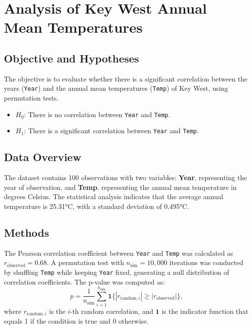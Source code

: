\documentclass[a4paper,10pt]{article}
\begin{document}
\pagestyle{empty}

\section*{\centering Analysis of Key West Annual Mean Temperatures}

\subsection*{Objective and Hypotheses}
The objective is to evaluate whether there is a significant correlation between the years (\texttt{Year}) and the annual mean temperatures (\texttt{Temp}) of Key West, using permutation tests.

\begin{itemize}
    \item \(H_0\): There is no correlation between \texttt{Year} and \texttt{Temp}.
    \item \(H_1\): There is a significant correlation between \texttt{Year} and \texttt{Temp}.
\end{itemize}

\subsection*{Data Overview}
The dataset contains 100 observations with two variables: \textbf{Year}, representing the year of observation, and \textbf{Temp}, representing the annual mean temperature in degrees Celsius. The statistical analysis indicates that the average annual temperature is 25.31°C, with a standard deviation of 0.495°C.

\subsection*{Methods}
The Pearson correlation coefficient between \texttt{Year} and \texttt{Temp} was calculated as \( r_{\text{observed}} = 0.68 \). A permutation test with \( n_{\text{sim}} = 10,000 \) iterations was conducted by shuffling \texttt{Temp} while keeping \texttt{Year} fixed, generating a null distribution of correlation coefficients. The p-value was computed as:
\[
p = \frac{1}{n_{\text{sim}}} \sum_{i=1}^{n_{\text{sim}}} \mathbf{1}\{|r_{\text{random}, i}| \geq |r_{\text{observed}}|\},
\]
where \( r_{\text{random}, i} \) is the \( i \)-th random correlation, and \(\mathbf{1}\) is the indicator function that equals 1 if the condition is true and 0 otherwise.
\end{document}
